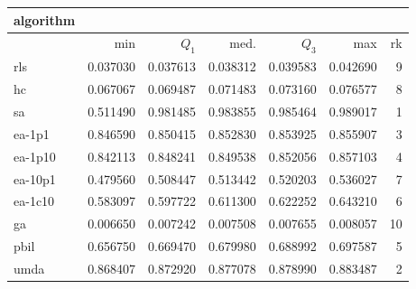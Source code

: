 \begin{tabular}{@{}l*{5}{>{{}}N{1}{3}}>{{}}N{2}{0}@{}}
\toprule
{algorithm} &  \\
\midrule
& {min} & {$Q_1$} & {med.} & {$Q_3$} & {max} & {rk}\\
\midrule
rls & 0.037030 & 0.037613 & 0.038312 & 0.039583 & 0.042690 & 9\\
hc & 0.067067 & 0.069487 & 0.071483 & 0.073160 & 0.076577 & 8\\
sa & 0.511490 & {\color{blue}} 0.981485 & {\color{blue}} 0.983855 & {\color{blue}} 0.985464 & {\color{blue}} 0.989017 & 1\\
ea-1p1 & 0.846590 & 0.850415 & 0.852830 & 0.853925 & 0.855907 & 3\\
ea-1p10 & 0.842113 & 0.848241 & 0.849538 & 0.852056 & 0.857103 & 4\\
ea-10p1 & 0.479560 & 0.508447 & 0.513442 & 0.520203 & 0.536027 & 7\\
ea-1c10 & 0.583097 & 0.597722 & 0.611300 & 0.622252 & 0.643210 & 6\\
ga & 0.006650 & 0.007242 & 0.007508 & 0.007655 & 0.008057 & 10\\
pbil & 0.656750 & 0.669470 & 0.679980 & 0.688992 & 0.697587 & 5\\
umda & {\color{blue}} 0.868407 & 0.872920 & 0.877078 & 0.878990 & 0.883487 & 2\\
\bottomrule
\end{tabular}
